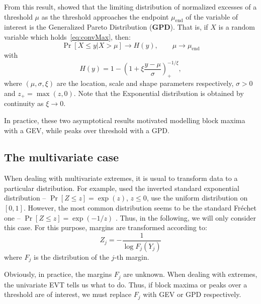\documentclass[a4paper]{article}
\numberwithin{equation}{section}
\theoremstyle{definition}
\begin{document}
From this result, \citet{Pickands1975} showed that the limiting
distribution of normalized excesses of a threshold $\mu$ as the
threshold approaches the endpoint $\mu_\mathrm{end}$ of the variable
of interest is the Generalized Pareto Distribution
(\textbf{GPD}). That is, if $X$ is a random variable which
holds~\eqref{eq:convMax}, then:
\begin{equation}
  \label{eq:convExcess}
  \Pr\left[X \leq y | X > \mu \right] \longrightarrow H(y), \qquad \mu
    \rightarrow \mu_\mathrm{end}
\end{equation}
with
\begin{equation}
  \label{eq:GPD}
  H(y) = 1 - \left(1 + \xi\frac{y-\mu}{\sigma}\right)_+^{-1/\xi},
\end{equation}
where $(\mu,\sigma,\xi)$ are the location, scale and shape parameters
respectively, $\sigma>0$ and $z_+=\max(z,0)$. Note that the
Exponential distribution is obtained by continuity as $\xi \rightarrow
0$.

In practice, these two asymptotical results motivated modelling block
maxima with a GEV, while peaks over threshold with a GPD.

\subsection{The multivariate case}
\label{subsec:multiv}

When dealing with multivariate extremes, it is usual to transform data
to a particular distribution. For example, \citet{Falk2005} used the
inverted standard exponential distribution -- $\Pr[Z \leq z ] =
\exp(z)$, $z \leq 0$, \citet{Coles1999} use the uniform distribution
on $[0,1]$. However, the most common distribution seems to be the
standard Fr\'echet one -- $\Pr[Z \leq z] = \exp(-1/z)$
\citep{Smith1994,Smith1997,Bortot2000}. Thus, in the following, we
will only consider this case. For this purpose, margins are
transformed according to:
\begin{displaymath}
  Z_j = - \frac{1}{\log F_j \left( Y_j \right)}
\end{displaymath}
where $F_j$ is the distribution of the $j$-th margin.

Obviously, in practice, the margins $F_j$ are unknown. When dealing
with extremes, the univariate EVT tells us what to do. Thus, if block
maxima or peaks over a threshold are of interest, we must replace
$F_j$ with GEV or GPD respectively.
\end{document}
